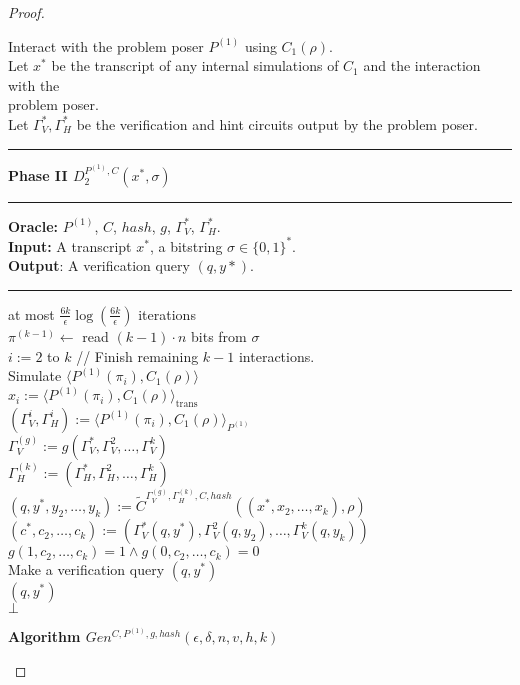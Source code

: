 \begin{proof}
\begin{codeblock}
  Interact with the problem poser $P^{(1)}$ using $C_1(\rho)$. \\
  \IndI Let $x^*$ be the transcript of any internal simulations of $C_1$ and the interaction with the  \\ \IndI problem poser.\\
  \IndI Let $\Gamma_V^*, \Gamma_H^*$ be the verification and hint circuits output by the problem poser.

  \medskip \hrule \medskip
  \textbf{Phase II $D_2^{P^{(1)}, C}(x^*, \sigma)$}
  \medskip \hrule \medskip
  \textbf{Oracle:} $P^{(1)}$, $C$, $hash$, $g$, $\Gamma_V^{*}$, $\Gamma_H^{*}$. \\
  \textbf{Input:} A transcript $x^*$, a bitstring $\sigma \in \{0,1\}^{*}$.\\
  \textbf{Output}: A verification query $(q, y*)$.
  \medskip \hrule \medskip
  \For at most $\frac{6k}{\epsilon} \log(\frac{6k}{\epsilon})$ iterations \Do \\
  \IndI $\pi^{(k-1)} \leftarrow$ read $(k-1)\cdot n$ bits from $\sigma$ \\
  \IndI \For $i:=2$ to $k$ \Do \IndIII // Finish remaining $k-1$ interactions. \\
  \IndII Simulate $\langle P^{(1)}(\pi_i), C_1(\rho)\rangle$ \\
  \IndIII $ x_i := \langle P^{(1)}(\pi_i), C_1(\rho)\rangle_{\text{trans}}$ \\
  \IndIII $(\Gamma_V^{i}, \Gamma_H^{i}) := \langle P^{(1)}(\pi_i), C_1(\rho) \rangle_{P^{(1)}}$ \\
  \IndI $\Gamma_V^{(g)} := g(\Gamma_V^{*}, \Gamma_V^{2}, \dots, \Gamma_V^{k})$  \\
  \IndI  $\Gamma_H^{(k)} := (\Gamma_H^{*}, \Gamma_H^{2}, \dots, \Gamma_H^{k})$ \\
  \IndI $(q, y^*, y_2, \dots, y_k) := \widetilde{C}^{\Gamma_V^{(g)}, \Gamma_H^{(k)}, C, hash}((x^*, x_2, \dots, x_k), \rho)$\\
  \IndI $(c^*, c_2, \dots, c_k) := (\Gamma_V^*(q, y^*), \Gamma_V^2(q, y_2), \dots, \Gamma_V^{k}(q, y_k))$ \\
  \IndI \If $g(1, c_{2}, \dots, c_k) = 1 \land g(0,c_{2}, \dots, c_k) = 0$ \then \\
  \IndII Make a verification query $(q, y^*)$ \\
  \IndII \return $(q, y^*)$ \\
  \return $\bot$
%
\end{codeblock}
%
\begin{codeblock}
  \textbf{Algorithm $Gen^{C,P^{(1)},g,hash}(\epsilon, \delta, n, v, h, k)$}

\end{codeblock}
\end{proof}
